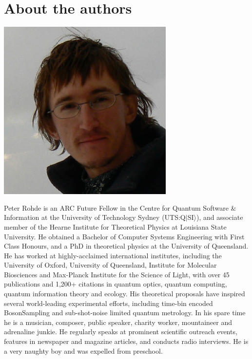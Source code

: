 %
%

\section*{About the authors}






\includegraphics[width=\columnwidth]{photo_peter_rohde}

Peter Rohde is an ARC Future Fellow in the Centre for Quantum Software \& Information at the University of Technology Sydney (UTS:Q$|$SI$\rangle$), and associate member of the Hearne Institute for Theoretical Physics at Louisiana State University. He obtained a Bachelor of Computer Systems Engineering with First Class Honours, and a PhD in theoretical physics at the University of Queensland. He has worked at highly-acclaimed international institutes, including the University of Oxford, University of Queensland, Institute for Molecular Biosciences and Max-Planck Institute for the Science of Light, with over 45 publications and 1,200+ citations in quantum optics, quantum computing, quantum information theory and ecology. His theoretical proposals have inspired several world-leading experimental efforts, including time-bin encoded {\sc BosonSampling} and sub-shot-noise limited quantum metrology. In his spare time he is a musician, composer, public speaker, charity worker, mountaineer and adrenaline junkie. He regularly speaks at prominent scientific outreach events, features in newspaper and magazine articles, and conducts radio interviews. He is a very naughty boy and was expelled from preschool.

